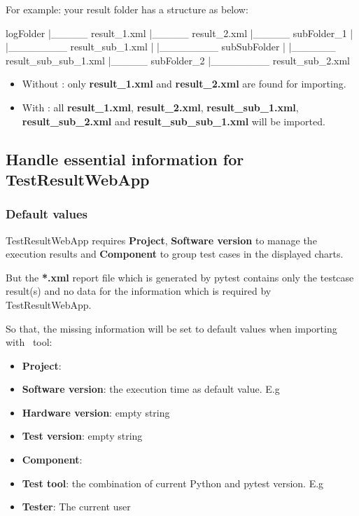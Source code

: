     For example: your result folder has a structure as below:

\begin{robotlog}
logFolder
   |_____ result_1.xml
   |_____ result_2.xml
   |_____ subFolder_1
   |         |________ result_sub_1.xml
   |         |________ subSubFolder
   |                       |______ result_sub_sub_1.xml
   |_____ subFolder_2
             |________ result_sub_2.xml
\end{robotlog}

    \begin{itemize}
    \tightlist
    \item
      Without : only \textbf{result\_1.xml} and
      \textbf{result\_2.xml} are found for importing.
    \item
      With : all \textbf{result\_1.xml},
      \textbf{result\_2.xml}, \textbf{result\_sub\_1.xml},
      \textbf{result\_sub\_2.xml} and \textbf{result\_sub\_sub\_1.xml} will
      be imported.
    \end{itemize}

  \hypertarget{handle-required-information}{%
  \subsection{Handle essential information for TestResultWebApp}
  \label{handle-required-information}}

  \hypertarget{default-values}{%
  \subsubsection{Default values}
  \label{default-values}}
    TestResultWebApp requires \textbf{Project}, \textbf{Software version} to
    manage the execution results and \textbf{Component} to group test cases in
    the displayed charts.

    But the \textbf{*.xml} report file which is generated by pytest contains
    only the testcase result(s) and no data for the information which is
    required by TestResultWebApp.

    So that, the missing information will be set to default values when
    importing with \pkg\ tool:

\begin{itemize}
\tightlist
\item
  \textbf{Project}: 
\item
  \textbf{Software version}: the execution time 
   as default value.
   E.g 
\item
  \textbf{Hardware version}: empty string
\item
  \textbf{Test version}: empty string
\item
  \textbf{Component}: 
\item
  \textbf{Test tool}: the combination of current Python and pytest version.
  E.g 
\item
  \textbf{Tester}: The current user
\end{itemize}

